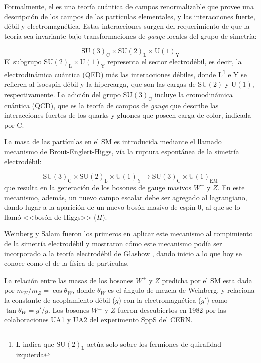Formalmente, el {\SM} es una teoría cuántica de campos renormalizable que provee
una descripción de los campos de las partículas elementales, y las interacciones
fuerte, débil y electromagnética. Estas interacciones surgen del requerimiento
de que la teoría sea invariante bajo transformaciones de \emph{gauge} locales del grupo
de simetría:

\begin{equation}
  \text{SU}(3)_\text{C} \times \text{SU}(2)_\text{L} \times \text{U}(1)_\text{Y}
\end{equation}
%
El subgrupo $\text{SU}(2)_\text{L} \times \text{U}(1)_\text{Y}$ representa el sector
electrodébil, es decir, la electrodinámica cuántica (QED) más las interacciones
débiles, donde L\footnote{L indica que $\text{SU}(2)_\text{L}$ actúa solo sobre los
  fermiones de quiralidad izquierda} e Y se refieren al isoespín débil y la
hipercarga, que son las cargas de $\text{SU}(2)$ y $\text{U}(1)$,
respectivamente. La adición del grupo $\text{SU}(3)_\text{C}$ incluye la cromodinámica
cuántica (QCD), que es la teoría de campos de \emph{gauge} que describe las
interacciones fuertes de los quarks y gluones que poseen carga de color,
indicada por C.

La masa de las partículas en el SM es introducida mediante el llamado mecanismo
de Brout-Englert-Higgs\cite{PhysRevLett.13.321,PhysRevLett.13.508}, vía la
ruptura espontánea de la simetría electrodébil:

\begin{equation}
  \text{SU}(3)_\text{C} \times \text{SU}(2)_\text{L} \times \text{U}(1)_\text{Y} \to \text{SU}(3)_\text{C}
  \times \text{U}(1)_\text{EM}
\end{equation}
%
que resulta en la generación de los bosones de gauge masivos $W^\pm$ y $Z$.
En este mecanismo, además, un nuevo campo escalar debe ser agregado al
lagrangiano, dando lugar a la aparición de un nuevo bosón masivo de espín
0, al que se lo llamó <<bosón de Higgs>> ($H$).

Weinberg y Salam fueron los primeros en aplicar este mecanismo al
rompimiento de la simetría electrodébil
\cite{PhysRevLett.19.1264,PhysRev.127.965} y mostraron cómo este mecanismo podía
ser incorporado a la teoría electrodébil de Glashow \cite{Glashow1961579}, dando
inicio a lo que hoy se conoce como el {\SM} de la física de partículas.

La relación entre las masas de los bosones $W^\pm$ y $Z$ predicha por el SM esta
dada por $m_W/m_Z = \cos \theta_W$, donde $\theta_W$ es el ángulo de
mezcla de Weinberg, y relaciona la constante de acoplamiento débil ($g$) con la
electromagnética ($g'$) como $\tan\theta_W = g'/g$. Los bosones $W^\pm$ y $Z$
fueron descubiertos en 1982 por las colaboraciones UA1 y UA2 del experimento
SppS del CERN.

